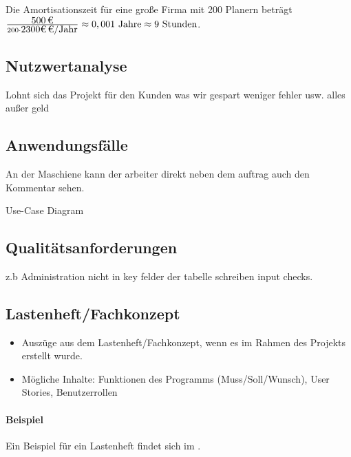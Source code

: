 Die Amortisationszeit für eine große Firma mit 200 Planern beträgt
$\frac{\eur{500}}{200 \cdot \eur{2300€} \mbox{/Jahr} } \approx 0,001 \mbox{ Jahre} \approx 9 \mbox{ Stunden}$.

\subsection{Nutzwertanalyse}
\label{sec:Nutzwertanalyse}
Lohnt sich das Projekt für den Kunden was wir gespart weniger fehler usw. alles außer geld


\subsection{Anwendungsfälle}
\label{sec:Anwendungsfaelle}

An der Maschiene kann der arbeiter direkt neben dem auftrag auch den Kommentar sehen.

Use-Case Diagram


\subsection{Qualitätsanforderungen}
\label{sec:Qualitaetsanforderungen}
z.b Administration nicht in key felder der tabelle schreiben input checks.


\subsection{Lastenheft/Fachkonzept}
\label{sec:Lastenheft}
\begin{itemize}
	\item Auszüge aus dem Lastenheft/Fachkonzept, wenn es im Rahmen des Projekts erstellt wurde.
	\item Mögliche Inhalte: Funktionen des Programms (Muss/Soll/Wunsch), User Stories, Benutzerrollen
\end{itemize}

\paragraph{Beispiel}
Ein Beispiel für ein Lastenheft findet sich im . 

